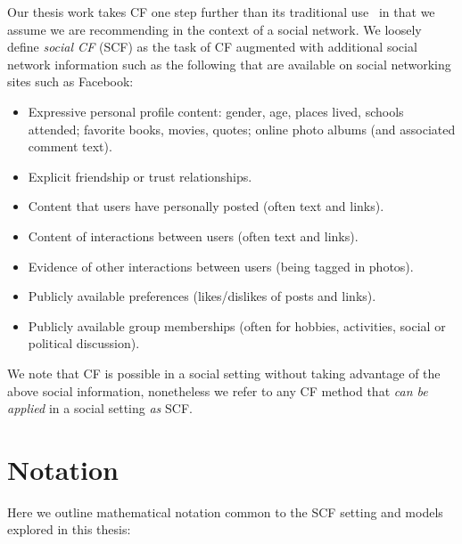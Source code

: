 Our thesis work takes CF one step further than its traditional 
use~\cite{collab_filtering} in that we assume we are
recommending in the context of a social network.  
We loosely define \emph{social CF} (SCF) as the task of CF augmented with
additional social network information such as the following that
are available on social networking sites such as Facebook:
\begin{itemize}
\item Expressive personal profile content: gender, age, places lived, schools
attended; favorite books, movies, quotes; online photo albums (and associated comment text).
\item Explicit friendship or trust relationships.
\item Content that users have personally posted (often text and links).
\item Content of interactions between users (often text and links).
\item Evidence of other interactions between users (being tagged in photos).
\item Publicly available preferences (likes/dislikes of posts and links).
\item Publicly available group memberships (often for hobbies, activities, social or political discussion).
\end{itemize}
We note that CF is possible in a social setting without taking advantage
of the above social information, nonetheless we refer to any CF method
that \emph{can be applied} in a social setting \emph{as} SCF.

\section{Notation}

Here we outline mathematical notation common to the SCF setting and
models explored in this thesis:

